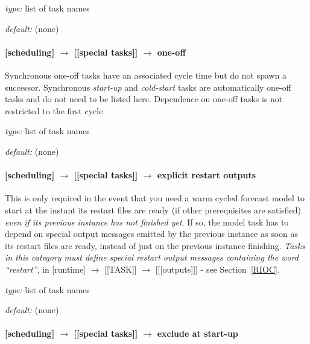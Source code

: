 \begin{myitemize}
    \item {\em type:} list of task names
    \item {\em default:} (none)
\end{myitemize}

\paragraph[one-off]{[scheduling] $\rightarrow$ [[special tasks]] $\rightarrow$ one-off}

Synchronous one-off tasks have an associated cycle time but do not spawn
a successor. Synchronous {\em start-up} and {\em cold-start} tasks are
automatically one-off tasks and do not need to be listed here.
Dependence on one-off tasks is not restricted to the first cycle.

\begin{myitemize}
\item {\em type:} list of task names
\item {\em default:} (none)
\end{myitemize}

\paragraph[explicit restart outputs]{[scheduling] $\rightarrow$ [[special tasks]] $\rightarrow$ explicit restart outputs}


This is only required in the event that you need a warm cycled forecast
model to start at the instant its restart files are ready (if other
prerequisites are satisfied) {\em even if its previous instance has
not finished yet}.  If so, the model task has to depend on special
output messages emitted by the previous instance as soon as its restart
files are ready, instead of just on the previous instance finishing.
{\em Tasks in this category must define special restart
output messages containing the word ``restart''}, in
[runtime] $\rightarrow$ [[TASK]] $\rightarrow$ [[[outputs]]] - see
Section~\ref{RIOC}.

\begin{myitemize}
    \item {\em type:} list of task names
    \item {\em default:} (none)
\end{myitemize}

\paragraph[exclude at start-up]{[scheduling] $\rightarrow$ [[special tasks]] $\rightarrow$ exclude at start-up}
\label{EASU}

